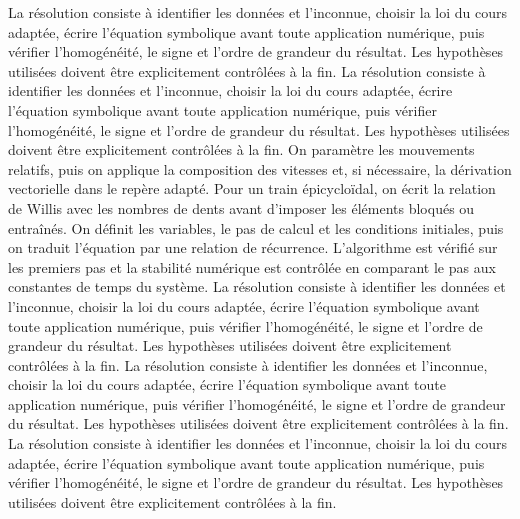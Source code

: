 \begin{corrigebox}[Corrigé]
La résolution consiste à identifier les données et l'inconnue, choisir la loi du cours adaptée, écrire l'équation symbolique avant toute application numérique, puis vérifier l'homogénéité, le signe et l'ordre de grandeur du résultat. Les hypothèses utilisées doivent être explicitement contrôlées à la fin.
La résolution consiste à identifier les données et l'inconnue, choisir la loi du cours adaptée, écrire l'équation symbolique avant toute application numérique, puis vérifier l'homogénéité, le signe et l'ordre de grandeur du résultat. Les hypothèses utilisées doivent être explicitement contrôlées à la fin.
On paramètre les mouvements relatifs, puis on applique la composition des vitesses et, si nécessaire, la dérivation vectorielle dans le repère adapté. Pour un train épicycloïdal, on écrit la relation de Willis avec les nombres de dents avant d'imposer les éléments bloqués ou entraînés.
On définit les variables, le pas de calcul et les conditions initiales, puis on traduit l'équation par une relation de récurrence. L'algorithme est vérifié sur les premiers pas et la stabilité numérique est contrôlée en comparant le pas aux constantes de temps du système.
La résolution consiste à identifier les données et l'inconnue, choisir la loi du cours adaptée, écrire l'équation symbolique avant toute application numérique, puis vérifier l'homogénéité, le signe et l'ordre de grandeur du résultat. Les hypothèses utilisées doivent être explicitement contrôlées à la fin.
La résolution consiste à identifier les données et l'inconnue, choisir la loi du cours adaptée, écrire l'équation symbolique avant toute application numérique, puis vérifier l'homogénéité, le signe et l'ordre de grandeur du résultat. Les hypothèses utilisées doivent être explicitement contrôlées à la fin.
La résolution consiste à identifier les données et l'inconnue, choisir la loi du cours adaptée, écrire l'équation symbolique avant toute application numérique, puis vérifier l'homogénéité, le signe et l'ordre de grandeur du résultat. Les hypothèses utilisées doivent être explicitement contrôlées à la fin.
\end{corrigebox}
